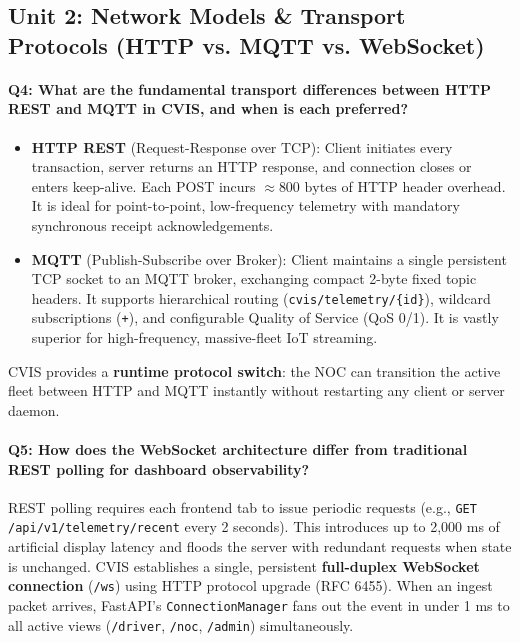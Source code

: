 \documentclass[12pt,a4paper]{report}
\begin{document}
\subsection{Unit 2: Network Models \& Transport Protocols (HTTP vs. MQTT vs. WebSocket)}

\paragraph{Q4: What are the fundamental transport differences between HTTP REST and MQTT in CVIS, and when is each preferred?}
\begin{itemize}[leftmargin=*,nosep]
  \item \textbf{HTTP REST} (Request-Response over TCP): Client initiates every transaction, server returns an HTTP response, and connection closes or enters keep-alive. Each POST incurs $\approx 800\text{ bytes}$ of HTTP header overhead. It is ideal for point-to-point, low-frequency telemetry with mandatory synchronous receipt acknowledgements.
  \item \textbf{MQTT} (Publish-Subscribe over Broker): Client maintains a single persistent TCP socket to an MQTT broker, exchanging compact 2-byte fixed topic headers. It supports hierarchical routing (\texttt{cvis/telemetry/\{id\}}), wildcard subscriptions (\texttt{+}), and configurable Quality of Service (QoS 0/1). It is vastly superior for high-frequency, massive-fleet IoT streaming.
\end{itemize}
CVIS provides a \textbf{runtime protocol switch}: the NOC can transition the active fleet between HTTP and MQTT instantly without restarting any client or server daemon.

\paragraph{Q5: How does the WebSocket architecture differ from traditional REST polling for dashboard observability?}
REST polling requires each frontend tab to issue periodic requests (e.g., \texttt{GET /api/v1/telemetry/recent} every 2 seconds). This introduces up to 2,000 ms of artificial display latency and floods the server with redundant requests when state is unchanged. CVIS establishes a single, persistent \textbf{full-duplex WebSocket connection} (\texttt{/ws}) using HTTP protocol upgrade (RFC 6455). When an ingest packet arrives, FastAPI's \texttt{ConnectionManager} fans out the event in under 1 ms to all active views (\texttt{/driver}, \texttt{/noc}, \texttt{/admin}) simultaneously.
\end{document}
